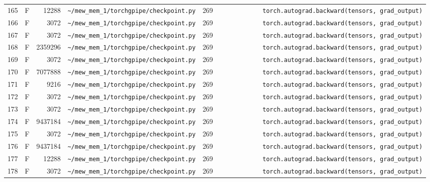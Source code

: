 \documentclass{article}
\begin{document}
\begin{longtable}{r l r p{6.5cm} r p{7.0cm}}
165 & F & 12288 & \lstinline|~/mew_mem_1/torchgpipe/checkpoint.py| & 269 & \lstinline|            torch.autograd.backward(tensors, grad_output)| \\
166 & F & 3072 & \lstinline|~/mew_mem_1/torchgpipe/checkpoint.py| & 269 & \lstinline|            torch.autograd.backward(tensors, grad_output)| \\
167 & F & 3072 & \lstinline|~/mew_mem_1/torchgpipe/checkpoint.py| & 269 & \lstinline|            torch.autograd.backward(tensors, grad_output)| \\
168 & F & 2359296 & \lstinline|~/mew_mem_1/torchgpipe/checkpoint.py| & 269 & \lstinline|            torch.autograd.backward(tensors, grad_output)| \\
169 & F & 3072 & \lstinline|~/mew_mem_1/torchgpipe/checkpoint.py| & 269 & \lstinline|            torch.autograd.backward(tensors, grad_output)| \\
170 & F & 7077888 & \lstinline|~/mew_mem_1/torchgpipe/checkpoint.py| & 269 & \lstinline|            torch.autograd.backward(tensors, grad_output)| \\
171 & F & 9216 & \lstinline|~/mew_mem_1/torchgpipe/checkpoint.py| & 269 & \lstinline|            torch.autograd.backward(tensors, grad_output)| \\
172 & F & 3072 & \lstinline|~/mew_mem_1/torchgpipe/checkpoint.py| & 269 & \lstinline|            torch.autograd.backward(tensors, grad_output)| \\
173 & F & 3072 & \lstinline|~/mew_mem_1/torchgpipe/checkpoint.py| & 269 & \lstinline|            torch.autograd.backward(tensors, grad_output)| \\
174 & F & 9437184 & \lstinline|~/mew_mem_1/torchgpipe/checkpoint.py| & 269 & \lstinline|            torch.autograd.backward(tensors, grad_output)| \\
175 & F & 3072 & \lstinline|~/mew_mem_1/torchgpipe/checkpoint.py| & 269 & \lstinline|            torch.autograd.backward(tensors, grad_output)| \\
176 & F & 9437184 & \lstinline|~/mew_mem_1/torchgpipe/checkpoint.py| & 269 & \lstinline|            torch.autograd.backward(tensors, grad_output)| \\
177 & F & 12288 & \lstinline|~/mew_mem_1/torchgpipe/checkpoint.py| & 269 & \lstinline|            torch.autograd.backward(tensors, grad_output)| \\
178 & F & 3072 & \lstinline|~/mew_mem_1/torchgpipe/checkpoint.py| & 269 & \lstinline|            torch.autograd.backward(tensors, grad_output)| \\

\end{longtable}
\end{document}
